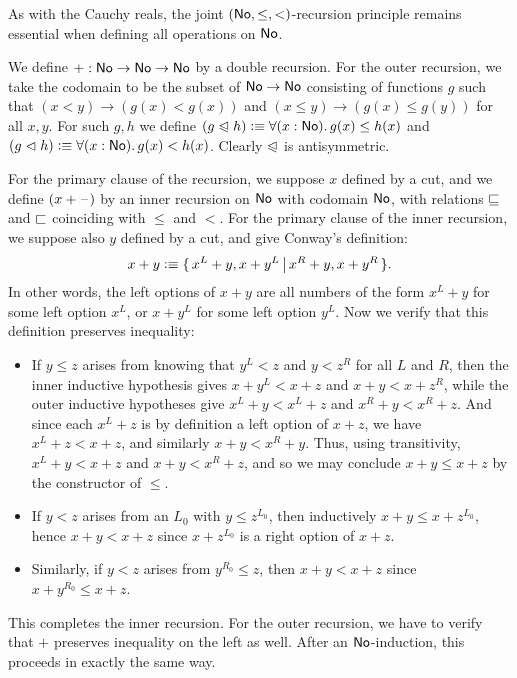 As with the Cauchy reals, the joint $(\mathsf{No},\le,<)$-recursion principle remains essential when defining all operations on $\mathsf{No}$.

\begin{eg}
%
We define $\mathord+:\mathsf{No}\to\mathsf{No}\to\mathsf{No}$ by a double recursion.
For the outer recursion, we take the codomain to be the subset of $\mathsf{No}\to\mathsf{No}$ consisting of functions $g$ such that $(x<y) \to (g(x)<g(x))$ and $(x\le y) \to (g(x)\le g(y))$ for all $x,y$.
For such $g,h$ we define $(g\ble h)\defeq \fall{x:\NO} g(x)\le h(x)$ and $(g\blt h)\defeq \fall{x:\NO} g(x)< h(x)$.
Clearly $\trianglelefteqslant$ is antisymmetric.

For the primary clause of the recursion, we suppose $x$ defined by a cut, and we define $(x+\mathord{\hspace{1pt}\text{--}\hspace{1pt}})$ by an inner recursion on $\mathsf{No}$ with codomain $\mathsf{No}$, with relations $\sqsubseteq$ and $\sqsubset$ coinciding with $\le$ and $<$.
For the primary clause of the inner recursion, we suppose also $y$ defined by a cut, and give Conway's definition:
\[ x+y \vcentcolon\equiv \{\,x^L+y, x+y^L\,\big|\,x^R+y,x+y^R\,\}. \]
In other words, the left options of $x+y$ are all numbers of the form $x^L+y$ for some left option $x^L$, or $x+y^L$ for some left option $y^L$.
Now we verify that this definition preserves inequality:
\begin{itemize}
\item If $y\le z$ arises from knowing that $y^L<z$ and $y<z^R$ for all $L$ and $R$, then the inner inductive hypothesis gives $x+y^L<x+z$ and $x+y < x+z^R$, while the outer inductive hypotheses give $x^L+y < x^L+z$ and $x^R+ y < x^R+z$.
  And since each $x^L+z$ is by definition a left option of $x+z$, we have $x^L+z < x+z$, and similarly $x+y < x^R+y$.
  Thus, using transitivity, $x^L+y < x+z$ and $x+y < x^R+z$, and so we may conclude $x+y \le x+z$ by the constructor of $\le$.
\item If $y<z$ arises from an $L_0$ with $y\le z^{L_0}$, then inductively $x+y \le x+z^{L_0}$, hence $x+y<x+z$ since $x+z^{L_0}$ is a right option of $x+z$.
\item Similarly, if $y<z$ arises from $y^{R_0}\le z$, then $x+y<x+z$ since $x+y^{R_0}\le x+z$.
\end{itemize}
This completes the inner recursion.
For the outer recursion, we have to verify that $+$ preserves inequality on the left as well.
After an $\mathsf{No}$-induction, this proceeds in exactly the same way.
\end{eg}

